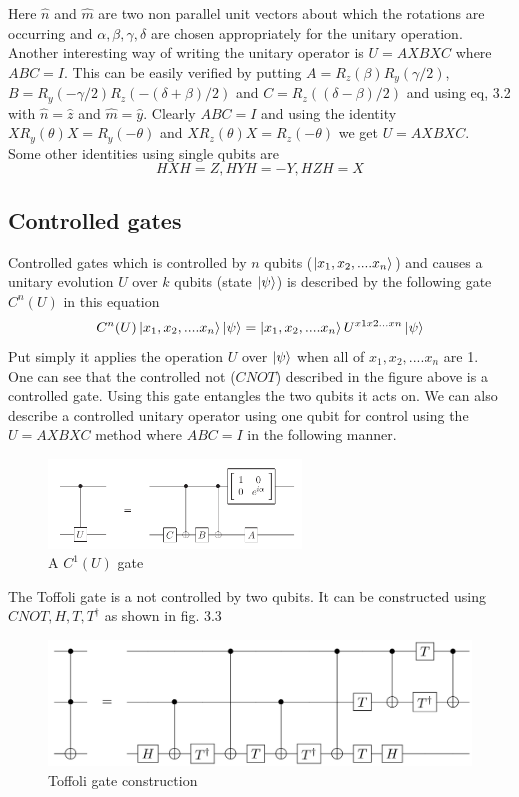 \documentclass{report}
\begin{document}
Here $\hat{n}$ and $\hat{m}$ are two non parallel unit vectors about which the rotations are occurring and $\alpha, \beta, \gamma, \delta$ are chosen appropriately for the unitary operation.\\
Another interesting way of writing the unitary operator is $U = AXBXC$ where $ABC = I$. This can be easily verified by putting $A = R_z(\beta)R_y(\gamma/2)$, $B = R_y(-\gamma/2)R_z(-(\delta + \beta)/2)$ and $C = R_z((\delta - \beta)/2)$ and using eq, 3.2 with $\hat{n} = \hat{z}$ and $\hat{m} = \hat{y}$. Clearly $ABC = I$ and using the identity $XR_y(\theta)X = R_y(-\theta)$ and $XR_z(\theta)X = R_z(-\theta)$ we get $U = AXBXC$.\\
Some other identities using single qubits are 
$$HXH = Z, HYH = -Y, HZH = X$$

\subsection{Controlled gates}
Controlled gates which is controlled by $n$ qubits ($\ket{x_1,x_2,....x_n}$) and causes a unitary evolution $U$ over $k$ qubits (state $\ket{\psi}$) is described by the following gate $C^n(U)$ in this equation
\begin{equation}C^n(U)\ket{x_1,x_2,....x_n}\ket{\psi} = \ket{x_1,x_2,....x_n}U^{x1x2...xn}\ket{\psi}\end{equation}
Put simply it applies the operation $U$ over $\ket{\psi}$ when all of $x_1,x_2,....x_n$ are 1.\\
One can see that the controlled not ($CNOT$) described in the figure above is a controlled gate. Using this gate entangles the two qubits it acts on. We can also describe a controlled unitary operator using one qubit for control using the $U = AXBXC$ method where $ABC = I$ in the following manner.
\begin{figure}[ht]
    \centering
    \includegraphics[width = 0.6\textwidth]{images/unitary.png}
    \caption{A $C^1(U)$ gate}
\end{figure}
The Toffoli gate is a not controlled by two qubits. It can be constructed using $CNOT, H, T, T^{\dagger}$ as shown in fig. 3.3\\
\begin{figure}[ht]
    \centering
    \includegraphics[width = \textwidth]{images/toffoli construction.png}
    \caption{Toffoli gate construction}
\end{figure}\\
\end{document}
